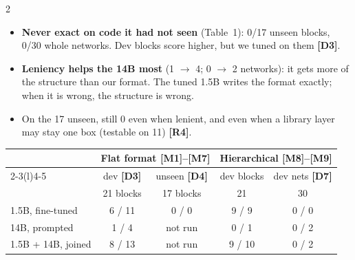 \documentclass[10pt]{article}
\newcommand{\tg}[1]{\textcolor{tagc}{\textbf{[#1]}}}
\begin{document}
\begin{multicols}{2}
\begin{itemize}
\item \textbf{Never exact on code it had not seen} (Table~1): 0/17 unseen blocks, 0/30 whole networks. Dev blocks score
higher, but we tuned on them \tg{D3}.
\item \textbf{Leniency helps the 14B most} (1 $\rightarrow$ 4; 0 $\rightarrow$ 2 networks): it gets more of the
structure than our format. The tuned 1.5B writes the format exactly; when it is wrong, the structure is wrong.
\item On the 17 unseen, still 0 even when lenient, and even when a library layer may stay one box (testable on 11) \tg{R4}.
\end{itemize}
\vspace{2pt}
\noindent\begin{minipage}{\columnwidth}\centering\footnotesize\setlength{\tabcolsep}{2.2pt}
\begin{tabular}{@{}lcccc@{}}
\toprule
& \multicolumn{2}{c}{Flat format \tg{M1}--\tg{M7}} & \multicolumn{2}{c}{Hierarchical \tg{M8}--\tg{M9}}\\
\cmidrule(lr){2-3}\cmidrule(l){4-5}
& dev \tg{D3} & unseen \tg{D4} & dev blocks & dev nets \tg{D7}\\
& 21 blocks & 17 blocks & 21 & 30\\
\midrule
1.5B, fine-tuned & 6 / 11 & 0 / 0 & 9 / 9 & 0 / 0\\
14B, prompted & 1 / 4 & not run & 0 / 1 & 0 / 2\\
1.5B + 14B, joined & 8 / 13 & not run & 9 / 10 & 0 / 2\\
\bottomrule
\end{tabular}
\end{minipage}\vspace{2pt}


\end{multicols}
\end{document}
